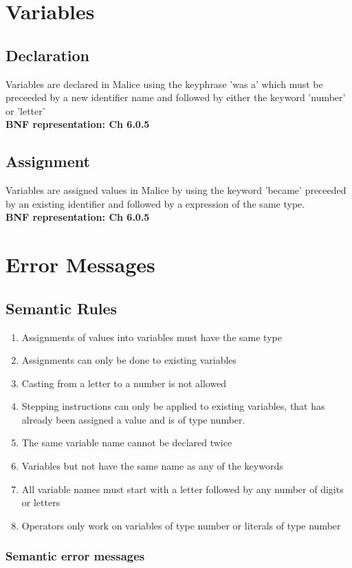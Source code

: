 \documentclass[10pt]{article}
\begin{document}
  \section{Variables}
  \subsection{Declaration}
  Variables are declared in Malice using the keyphrase 'was a' which must be preceeded by a new identifier name and followed by either the keyword 'number' or 'letter'
  \\{\bf BNF representation: Ch 6.0.5}
  \subsection{Assignment}
  Variables are assigned values in Malice by using the keyword 'became' preceeded by an existing identifier and followed by a expression of the same type.
  \\{\bf BNF representation: Ch 6.0.5}
  \section{Error Messages}
  \subsection{Semantic Rules}
  \begin{enumerate}
  \item Assignments of values into variables must have the same type 
  \item Assignments can only be done to existing variables
  \item Casting from a letter to a number is not allowed
  \item Stepping instructions can only be applied to existing variables, that has already been assigned a value and is of type number.
  \item The same variable name cannot be declared twice
  \item Variables but not have the same name as any of the keywords
  \item All variable names must start with a letter followed by any number of digits or letters
  \item Operators only work on variables of type number or literals of type number
  \end{enumerate}
  \subsubsection{Semantic error messages}
  
\end{document}
